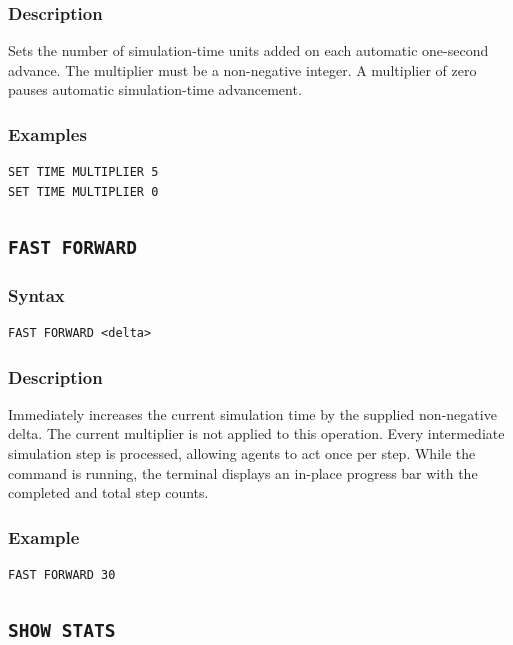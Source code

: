 \documentclass{article}
\begin{document}
\subsubsection*{Description}

Sets the number of simulation-time units added on each automatic one-second
advance. The multiplier must be a non-negative integer. A multiplier of zero
pauses automatic simulation-time advancement.

\subsubsection*{Examples}

\begin{lstlisting}
SET TIME MULTIPLIER 5
SET TIME MULTIPLIER 0
\end{lstlisting}

\subsection{\texttt{FAST FORWARD}}

\subsubsection*{Syntax}

\begin{lstlisting}
FAST FORWARD <delta>
\end{lstlisting}

\subsubsection*{Description}

Immediately increases the current simulation time by the supplied
non-negative delta. The current multiplier is not applied to this operation.
Every intermediate simulation step is processed, allowing agents to act once
per step. While the command is running, the terminal displays an in-place
progress bar with the completed and total step counts.

\subsubsection*{Example}

\begin{lstlisting}
FAST FORWARD 30
\end{lstlisting}

\subsection{\texttt{SHOW STATS}}
\end{document}

